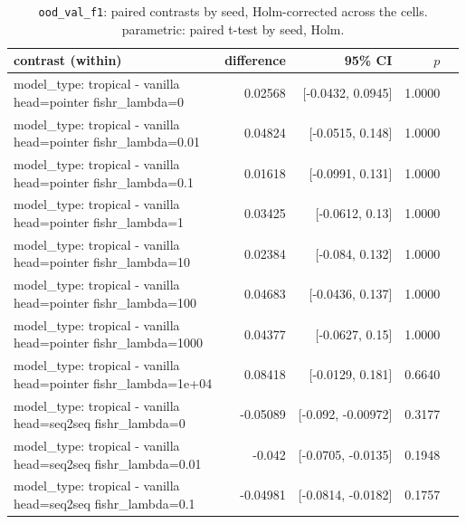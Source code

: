 \documentclass[10pt]{article}
\makeatletter
\newcommand{\stackcell}[1]{\begin{tabular}[t]{@{}l@{}}#1\end{tabular}}
\makeatother
\begin{document}
{\small
\begin{longtable}{lrrrl}
\caption{\texttt{ood\_val\_f1}: paired contrasts by seed, Holm-corrected across the cells. parametric: paired t-test by seed, Holm.}\label{tab:paired-ood_val_f1}\\
\toprule
contrast (within) & difference & 95\% CI & $p$ & \\
\midrule
\endhead
\stackcell{model\_type: tropical - vanilla\\\footnotesize head=pointer fishr\_lambda=0 } & 0.02568 & [-0.0432, 0.0945] & 1.0000 & \\
\stackcell{model\_type: tropical - vanilla\\\footnotesize head=pointer fishr\_lambda=0.01 } & 0.04824 & [-0.0515, 0.148] & 1.0000 & \\
\stackcell{model\_type: tropical - vanilla\\\footnotesize head=pointer fishr\_lambda=0.1 } & 0.01618 & [-0.0991, 0.131] & 1.0000 & \\
\stackcell{model\_type: tropical - vanilla\\\footnotesize head=pointer fishr\_lambda=1 } & 0.03425 & [-0.0612, 0.13] & 1.0000 & \\
\stackcell{model\_type: tropical - vanilla\\\footnotesize head=pointer fishr\_lambda=10 } & 0.02384 & [-0.084, 0.132] & 1.0000 & \\
\stackcell{model\_type: tropical - vanilla\\\footnotesize head=pointer fishr\_lambda=100 } & 0.04683 & [-0.0436, 0.137] & 1.0000 & \\
\stackcell{model\_type: tropical - vanilla\\\footnotesize head=pointer fishr\_lambda=1000 } & 0.04377 & [-0.0627, 0.15] & 1.0000 & \\
\stackcell{model\_type: tropical - vanilla\\\footnotesize head=pointer fishr\_lambda=1e+04 } & 0.08418 & [-0.0129, 0.181] & 0.6640 & \\
\stackcell{model\_type: tropical - vanilla\\\footnotesize head=seq2seq fishr\_lambda=0 } & -0.05089 & [-0.092, -0.00972] & 0.3177 & \\
\stackcell{model\_type: tropical - vanilla\\\footnotesize head=seq2seq fishr\_lambda=0.01 } & -0.042 & [-0.0705, -0.0135] & 0.1948 & \\
\stackcell{model\_type: tropical - vanilla\\\footnotesize head=seq2seq fishr\_lambda=0.1 } & -0.04981 & [-0.0814, -0.0182] & 0.1757 & \\

\end{longtable}}
\end{document}
